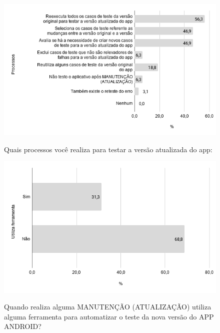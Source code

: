     
        \begin{figure}[!htb]
        \centering
        \includegraphics[width=.80\textwidth]{images/s_processostestemanutencao.png}
        \label{figure:s_processostestemanutencao}
        \caption{Quais processos você realiza para testar a versão atualizada do app:}
        \end{figure} 
    
    
        \begin{figure}[!htb]
        \centering
        \includegraphics[width=.80\textwidth]{images/s_testenovo.png}
        \label{figure:s_testenovo}
        \caption{Quando realiza alguma MANUTENÇÃO (ATUALIZAÇÃO) utiliza alguma ferramenta para automatizar o teste da nova versão do APP ANDROID?}
        \end{figure}
    
